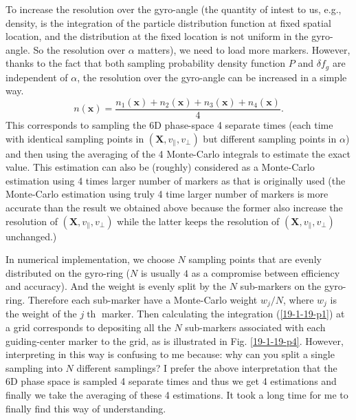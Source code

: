 \documentclass{llncs}
\newcommand{\tmop}[1]{\ensuremath{\operatorname{#1}}}
\begin{document}
To increase the resolution over the gyro-angle (the quantity of intest to us,
e.g., density, is the integration of the particle distribution function at
fixed spatial location, and the distribution at the fixed location is not
uniform in the gyro-angle. So the resolution over $\alpha$ matters), we need
to load more markers. However, thanks to the fact that both sampling
probability density function $P$ and $\delta f_g$ are independent of $\alpha$,
the resolution over the gyro-angle can be increased in a simple way.
\begin{equation}
  n (\mathbf{x}) = \frac{n_1 (\mathbf{x}) + n_2 (\mathbf{x}) + n_3
  (\mathbf{x}) + n_4 (\mathbf{x})}{4} .
\end{equation}
This corresponds to sampling the 6D phase-space 4 separate times (each time
with identical sampling points in $(\mathbf{X}, v_{\parallel}, v_{\perp})$ but
different sampling points in $\alpha$) and then using the averaging of the 4
Monte-Carlo integrals to estimate the exact value. This estimation can also be
(roughly) considered as a Monte-Carlo estimation using 4 times larger number
of markers as that is originally used (the Monte-Carlo estimation using truly
4 time larger number of markers is more accurate than the result we obtained
above because the former also increase the resolution of $(\mathbf{X},
v_{\parallel}, v_{\perp})$ while the latter keeps the resolution of
$(\mathbf{X}, v_{\parallel}, v_{\perp})$ unchanged.)

In numerical implementation, we choose $N$ sampling points that are evenly
distributed on the gyro-ring ($N$ is usually $4$ as a compromise between
efficiency and accuracy). And the weight is evenly split by the $N$
sub-markers on the gyro-ring. Therefore each sub-marker have a Monte-Carlo
weight $w_j / N$, where $w_j$ is the weight of the $j \tmop{th}$ marker. Then
calculating the integration (\ref{19-1-19-p1}) at a grid corresponds to
depositing all the $N$ sub-markers associated with each guiding-center marker
to the grid, as is illustrated in Fig. \ref{19-1-19-p4}. However, interpreting
in this way is confusing to me because: why can you split a single sampling
into $N$ different samplings? I prefer the above interpretation that the 6D
phase space is sampled 4 separate times and thus we get 4 estimations and
finally we take the averaging of these 4 estimations. It took a long time for
me to finally find this way of understanding.
\end{document}
